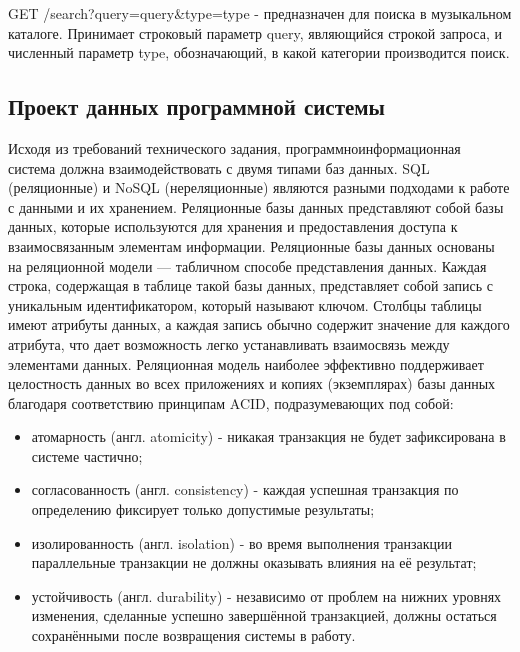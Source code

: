 GET /search?query={query}\&type={}type - предназначен для поиска в музыкальном каталоге. Принимает строковый параметр query, являющийся строкой запроса, и численный параметр type, обозначающий, в какой категории производится поиск.


\subsection{Проект данных программной системы}

Исходя из требований технического задания, программноинформационная система должна взаимодействовать с двумя типами баз
данных.
SQL\cite{sql1} (реляционные) и NoSQL (нереляционные) являются разными подходами к работе с данными и их хранением. Реляционные базы данных представляют собой базы данных, которые используются для хранения и предоставления доступа к взаимосвязанным элементам информации. Реляционные базы данных основаны на реляционной модели — табличном способе представления данных. Каждая строка, содержащая в таблице такой базы данных, представляет собой запись с уникальным идентификатором, который называют ключом. Столбцы таблицы имеют атрибуты данных, а каждая запись обычно содержит значение для каждого атрибута, что дает возможность легко устанавливать взаимосвязь между элементами данных. Реляционная модель наиболее эффективно поддерживает целостность данных во всех приложениях и копиях (экземплярах) базы данных благодаря соответствию принципам ACID, подразумевающих под собой:
\begin{itemize}
	\item атомарность (англ. atomicity) - никакая транзакция не будет зафиксирована в системе частично;
	\item согласованность (англ. consistency) - каждая успешная транзакция по определению фиксирует только допустимые результаты;
	\item изолированность (англ. isolation) - во время выполнения транзакции параллельные транзакции не должны оказывать влияния на её результат;
	\item устойчивость (англ. durability) - независимо от проблем на нижних уровнях изменения, сделанные успешно завершённой транзакцией, должны остаться сохранёнными после возвращения системы в работу.
\end{itemize}

